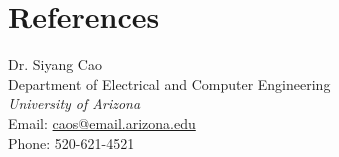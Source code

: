 \documentclass[letterpaper,10pt]{article}
\renewenvironment{itemize}{
  \begin{list}{}{
    \setlength{\leftmargin}{1.5em}
  }
}{
  \end{list}
}
\begin{document}
\section*{References}
\begin{itemize}
\item Dr. Siyang Cao\\
Department of Electrical and Computer Engineering\\
{\it University of Arizona}\\
Email: \href{mailto:caos@email.arizona.edu}{caos@email.arizona.edu}\\
Phone: 520-621-4521
\end{itemize}
\bigskip
\end{document}
